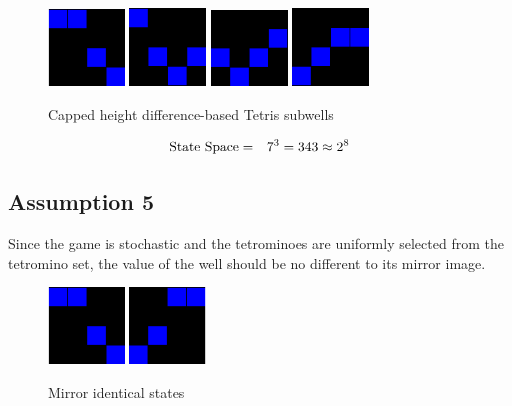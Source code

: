 \documentclass{rucsthesis}
\begin{document}
\begin{figure}[h]
\centering
\includegraphics[width=0.8in]{reducedwell.png}
\includegraphics[width=0.8in]{reducedwell2.png}
\includegraphics[width=0.8in]{reducedwell3.png}
\includegraphics[width=0.8in]{reducedwell4.png}
\caption{Capped height difference-based Tetris subwells}
\label{fig:redwell}
\end{figure}

\begin{eqnarray*}
\centering
\textrm{State Space} & = & 7^{3} = 343 \approx 2^{8}
\end{eqnarray*}

\subsection*{Assumption 5}

Since the game is stochastic and the tetrominoes are uniformly selected from the tetromino set, the value of the well should be no different to its mirror image.

\begin{figure}[h]
\centering
\includegraphics[width=0.8in]{reducedwell.png}
\includegraphics[width=0.8in]{mirrorwell.png}
\caption{Mirror identical states}
\label{fig:mirrorwell}
\end{figure}
\end{document}
